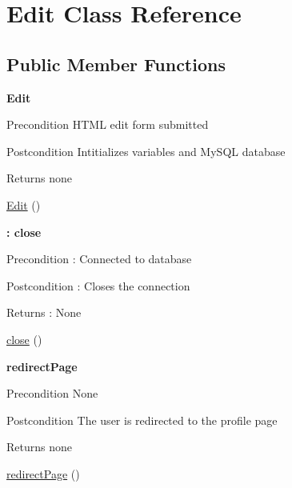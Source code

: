 \hypertarget{class_edit}{}\section{Edit Class Reference}
\label{class_edit}
\subsection*{Public Member Functions}
\begin{Indent}{\bf Edit}\par
{\em \begin{DoxyPrecond}{Precondition}
H\+T\+ML edit form submitted 
\end{DoxyPrecond}
\begin{DoxyPostcond}{Postcondition}
Intitializes variables and My\+S\+QL database 
\end{DoxyPostcond}
\begin{DoxyReturn}{Returns}
none 
\end{DoxyReturn}
}\begin{DoxyCompactItemize}
\item 
\hyperlink{class_edit_a994767a8475f2cdbd3542c0413875f51}{Edit} ()
\end{DoxyCompactItemize}
\end{Indent}
\begin{Indent}{\bf \+: close}\par
{\em \begin{DoxyPrecond}{Precondition}
\+: Connected to database 
\end{DoxyPrecond}
\begin{DoxyPostcond}{Postcondition}
\+: Closes the connection 
\end{DoxyPostcond}
\begin{DoxyReturn}{Returns}
\+: None 
\end{DoxyReturn}
}\begin{DoxyCompactItemize}
\item 
\hyperlink{class_edit_aa69c8bf1f1dcf4e72552efff1fe3e87e}{close} ()
\end{DoxyCompactItemize}
\end{Indent}
\begin{Indent}{\bf redirect\+Page}\par
{\em \begin{DoxyPrecond}{Precondition}
None 
\end{DoxyPrecond}
\begin{DoxyPostcond}{Postcondition}
The user is redirected to the profile page 
\end{DoxyPostcond}
\begin{DoxyReturn}{Returns}
none 
\end{DoxyReturn}
}\begin{DoxyCompactItemize}
\item 
\hyperlink{class_edit_a7861c9f362036f0f145f12e70c3d63c3}{redirect\+Page} ()
\end{DoxyCompactItemize}
\end{Indent}
